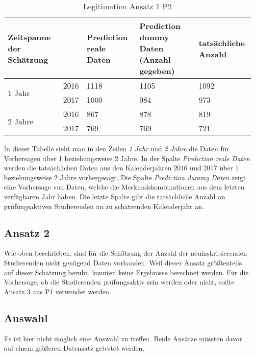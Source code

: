 \begin{table}[ht]
  \caption{\label{tab:legitimationA1P2} Legitimation Ansatz 1 P2}
  \begin{tabular}{ p{2.5cm} p{1cm} p{3cm} p{3cm} p{3cm} }
    \toprule
    Zeitspanne der Sch\"atzung &      & Prediction reale Daten & Prediction dummy Daten (Anzahl gegeben) & tats\"achliche Anzahl \\
    \midrule
    \multirow{2}{3em}{1 Jahr}
                               & 2016 & 1118                   & 1105                                    & 1092                  \\
                               & 2017 & 1000                   & 984                                     & 973                   \\
    \midrule
    \multirow{2}{4em}{2 Jahre}
                               & 2016 & 867                    & 878                                     & 819                   \\
                               & 2017 & 769                    & 769                                     & 721                   \\

    \bottomrule
  \end{tabular}

\end{table}

In dieser Tabelle sieht man in den Zeilen \textit{1 Jahr} und \textit{2 Jahre} die Daten f\"ur Vorhersagen \"uber 1 beziehungsweise 2 Jahre.
In der Spalte \textit{Prediction reale Daten} werden die tats\"achlichen Daten aus den Kalenderjahren 2016 und 2017 \"uber 1 beziehungsweise
2 Jahre vorhergesagt. Die Spalte \textit{Prediction dummy Daten} zeigt eine Vorhersage von Daten, welche die Merkmalskombinationen aus dem letzten
verf\"ugbaren Jahr haben. Die letzte Spalte gibt die tats\"achliche Anzahl an pr\"ufungsaktiven Studierenden im zu sch\"atzenden Kalenderjahr an.


\subsection{Ansatz 2}
Wie oben beschrieben, sind f\"ur die Sch\"atzung der Anzahl der neuinskribierenden Studierenden nicht gen\"ugend Daten vorhanden.
Weil dieser Ansatz gr\"o{\ss}tenteils auf dieser Sch\"atzung beruht, konnten keine Ergebnisse berechnet werden. F\"ur die Vorhersage,
ob die Studierenden pr\"ufungsaktiv sein werden oder nicht, sollte Ansatz 3 aus P1 verwendet werden.

\subsection{Auswahl}
Es ist hier nicht m\"oglich eine Auswahl zu treffen. Beide Ans\"atze m\"ussten davor auf einem gr\"o{\ss}eren Datensatz getestet werden.
